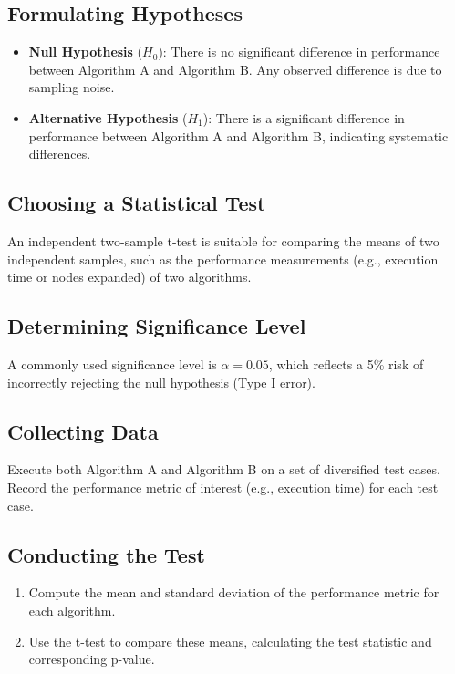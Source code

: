 \documentclass{article}
\begin{document}
\subsection{Formulating Hypotheses}
\begin{itemize}
    \item \textbf{Null Hypothesis} (\(H_0\)): There is no significant difference in performance between Algorithm A and Algorithm B. Any observed difference is due to sampling noise.
    \item \textbf{Alternative Hypothesis} (\(H_1\)): There is a significant difference in performance between Algorithm A and Algorithm B, indicating systematic differences.
\end{itemize}

\subsection{Choosing a Statistical Test}
An independent two-sample t-test is suitable for comparing the means of two independent samples, such as the performance measurements (e.g., execution time or nodes expanded) of two algorithms.

\subsection{Determining Significance Level}
A commonly used significance level is \(\alpha = 0.05\), which reflects a 5\% risk of incorrectly rejecting the null hypothesis (Type I error).

\subsection{Collecting Data}
Execute both Algorithm A and Algorithm B on a set of diversified test cases. Record the performance metric of interest (e.g., execution time) for each test case.

\subsection{Conducting the Test}
\begin{enumerate}
    \item Compute the mean and standard deviation of the performance metric for each algorithm.
    \item Use the t-test to compare these means, calculating the test statistic and corresponding p-value.
\end{enumerate}
\end{document}

